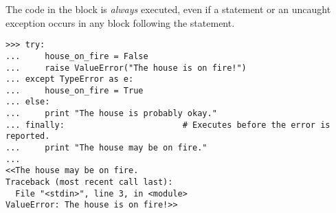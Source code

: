 The code in the  block is \emph{always} executed, even if a  statement or an uncaught exception occurs in any block following the  statement.

\begin{lstlisting}
>>> try:
...     house_on_fire = False
...     raise ValueError("The house is on fire!")
... except TypeError as e:
...     house_on_fire = True
... else:
...     print "The house is probably okay."
... finally:                        # Executes before the error is reported.
...     print "The house may be on fire."
... 
<<The house may be on fire.
Traceback (most recent call last):
  File "<stdin>", line 3, in <module>
ValueError: The house is on fire!>>
\end{lstlisting}

\begin{comment} %
\begin{warn} %
Having \li{except} by itself will catch \emph{any} exception raised in the \li{try} block, but this approach can mistakenly mask unexpected errors.
Consider the following function, which intends to avoid dividing by zero.

\begin{lstlisting}
>>> def divider(x, y):
...     try:
...         return x / float(yy)
...     except:
...         print("y must not equal zero!")
... 
>>> divider(2, 3)
<<y must not equal zero!>>
\end{lstlisting}

Because \li{y} was misspelled, a \li{NameError} will be raised every time this function is called.
Be specific about the kind of exception you expect to encounter.

\begin{lstlisting}
>>> def divider(x, y):
...     try:
...         return x / float(yy)
...     except ZeroDivisionError:
...         print("y must not equal zero!")
... 
>>> divider(2, 3)
<<Traceback (most recent call last):
  File "<stdin>", line 1, in <module>
  File "<stdin>", line 3, in divider
NameError: global name 'yy' is not defined>>
\end{lstlisting}
\end{warn}
\end{comment}

